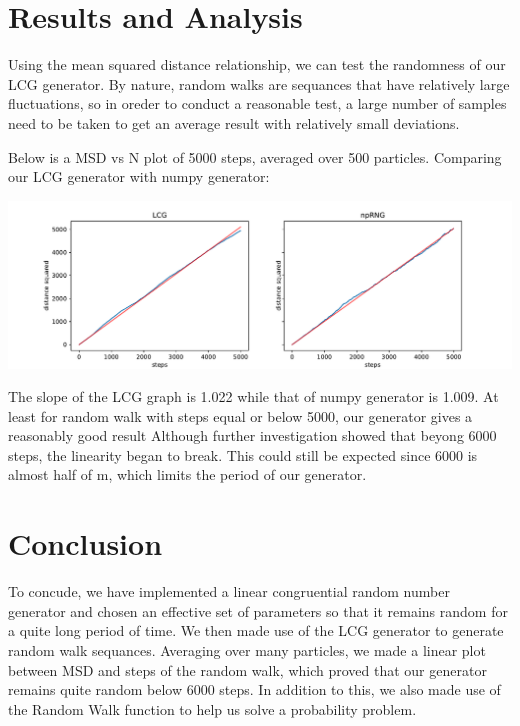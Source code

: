 \documentclass{article}
\begin{document}
\section{Results and Analysis}

Using the mean squared distance relationship, we can test the randomness of our LCG 
generator. By nature, random walks are sequances that have relatively large fluctuations,
so in oreder to conduct a reasonable test, a large number of samples need to be taken to
get an average result with relatively small deviations.

Below is a MSD vs N plot of 5000 steps, averaged over 500 particles. Comparing our LCG
generator with numpy generator:

\includegraphics[width=\textwidth]{linear.pdf}

The slope of the LCG graph is 1.022 while that of numpy generator is 1.009. At least for
random walk with steps equal or below 5000, our generator gives a reasonably good result Although further investigation showed that beyong 6000 steps, the linearity began to 
break. This could still be expected since 6000 is almost half of m, which limits the 
period of our generator.

\section{Conclusion}

To concude, we have implemented a linear congruential random number generator and chosen
an effective set of parameters so that it remains random for a quite long period of time.
We then made use of the LCG generator to generate random walk sequances. Averaging over
many particles, we made a linear plot between MSD and steps of the random walk, which 
proved that our generator remains quite random below 6000 steps. In addition to this, 
we also made use of the Random Walk function to help us solve a probability problem.

\begin{thebibliography}{1}
   Weisstein,Eric W. "P\'olya's Random Walk Constants." From MathWorldld: A Wolfram Web Resource. http://mathworld.wolfram.com/PolyasRandomWalkConstants.html
 }
\end{thebibliography}
\end{document}
